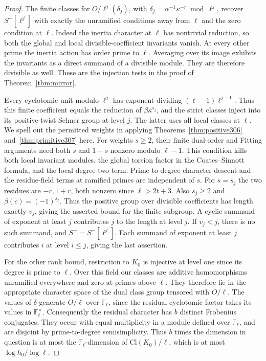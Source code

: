 \documentclass[a4paper,11pt]{article}
\theoremstyle{definition}
\theoremstyle{remark}
\numberwithin{equation}{section}
\begin{document}
\begin{proof}
The finite classes for \(O/\ell^j(\delta_j)\), with
\(\delta_j=\alpha^{-1}\kappa^{-r}\bmod\ell^j\), recover
\(S^-[\ell^j]\) with exactly the unramified conditions away
from \(\ell\) and the zero condition at \(\ell\). Indeed
the inertia character at \(\ell\) has nontrivial reduction, so
both the global and local divisible-coefficient invariants
vanish. At every other prime the inertia action has order
prime to \(\ell\). Averaging over its image exhibits the
invariants as a direct summand of a divisible module.
They are therefore divisible as well. These are
the injection tests in the proof of Theorem~\ref{thm:mirror}.

Every cyclotomic unit modulo \(\ell^j\) has exponent dividing
\((\ell-1)\ell^{j-1}\). Thus this finite coefficient equals
the reduction of \(\beta\kappa^{s_j}\), and the strict classes
inject into its positive-twist Selmer group at level \(j\).
The latter uses all local classes at \(\ell\).
We spell out the permitted weights in applying
Theorems~\ref{thm:positive306} and~\ref{thm:primitive307}
here. For weights \(s\ge2\), their finite dual-order and
Fitting arguments need both \(s\) and \(1-s\) nonzero
modulo \(\ell-1\). This condition kills both local invariant
modules, the global torsion factor in the Coates--Sinnott
formula, and the local degree-two term. Prime-to-degree
character descent and the residue-field terms at ramified
primes are independent of \(s\). For \(s=s_j\) the two residues
are \(-r,1+r\), both nonzero since \(\ell>2t+3\).
Also \(s_j\ge2\) and \(\beta(c)=(-1)^{s_j}\). Thus the
positive group over divisible coefficients has length exactly
\(v_j\), giving the asserted bound for the finite subgroup.
A cyclic summand of exponent at least \(j\) contributes
\(j\) to the length at level \(j\). If \(v_j<j\), there is
no such summand, and \(S^-=S^-[\ell^j]\). Each summand
of exponent at least \(j\) contributes
\(i\) at level \(i\le j\), giving the last assertion.

For the other rank bound, restriction to \(K_0\) is injective
at level one since its degree is prime to \(\ell\). Over this
field our classes are additive homomorphisms unramified
everywhere and zero at primes above \(\ell\). They therefore
lie in the appropriate character space of the dual class group
tensored with \(O/\ell\). The values of \(\delta\) generate
\(O/\ell\) over \(\mathbb F_\ell\), since the residual
cyclotomic factor takes its values in \(\mathbb F_\ell^\times\).
Consequently the residual character has \(b\) distinct
Frobenius conjugates. They occur with equal multiplicity in
a module defined over \(\mathbb F_\ell\), and are disjoint by
prime-to-degree semisimplicity. Thus \(b\) times the dimension
in question is at most the \(\mathbb F_\ell\)-dimension of
\(\mathrm{Cl}(K_0)/\ell\), which is at most
\(\log h_0/\log\ell\).
\end{proof}
\end{document}
